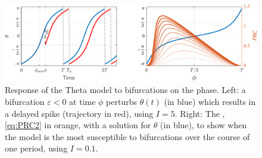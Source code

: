 \begin{figure}[H]
\centering
\includegraphics[width = \textwidth]{../Figures/ThetaNeuronPRC.pdf}
\caption{Response of the Theta model to bifurcations on the phase. Left: a bifurcation $\varepsilon  < 0 $ at time $\phi$ perturbs $\theta(t)$ (in blue) which results in a delayed spike (trajectory in red), using $I = 5$. Right: The \PRC, \eqref{eq:PRC2} in orange, with a solution for $\theta$ (in blue), to show when the model is the most susceptible to bifurcations over the course of one period, using $I = 0.1$.}
\label{fig:ThetaNeuronfIPRC}
\end{figure}


